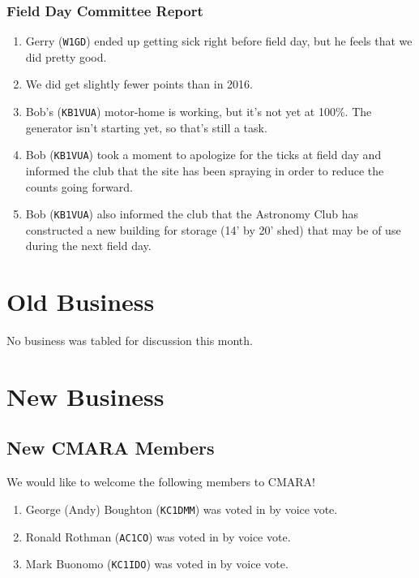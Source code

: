 \documentclass[10pt,letterpaper]{article}
\begin{document}
\subsubsection{Field Day Committee Report}
\begin{enumerate}
  \item Gerry (\texttt{W1GD}) ended up getting sick right before field day, but he feels that we did pretty good.
  \item We did get slightly fewer points than in 2016.
  \item Bob's (\texttt{KB1VUA}) motor-home is working, but it's not yet at 100\%. The generator isn't starting yet, so that's still a task.
  \item Bob (\texttt{KB1VUA}) took a moment to apologize for the ticks at field day and informed the club that the site has been spraying in order to reduce the counts going forward.
  \item Bob (\texttt{KB1VUA}) also informed the club that the Astronomy Club has constructed a new building for storage (14' by 20' shed) that may be of use during the next field day.
\end{enumerate}

\section{Old Business}
No business was tabled for discussion this month.

\section{New Business}

\subsection{New CMARA Members}
\label{new-cmara-members}
We would like to welcome the following members to CMARA!
\begin{enumerate}
  \item George (Andy) Boughton (\texttt{KC1DMM}) was voted in by voice vote.
  \item Ronald Rothman (\texttt{AC1CO}) was voted in by voice vote.
  \item Mark Buonomo (\texttt{KC1IDO}) was voted in by voice vote.
\end{enumerate}
\end{document}
